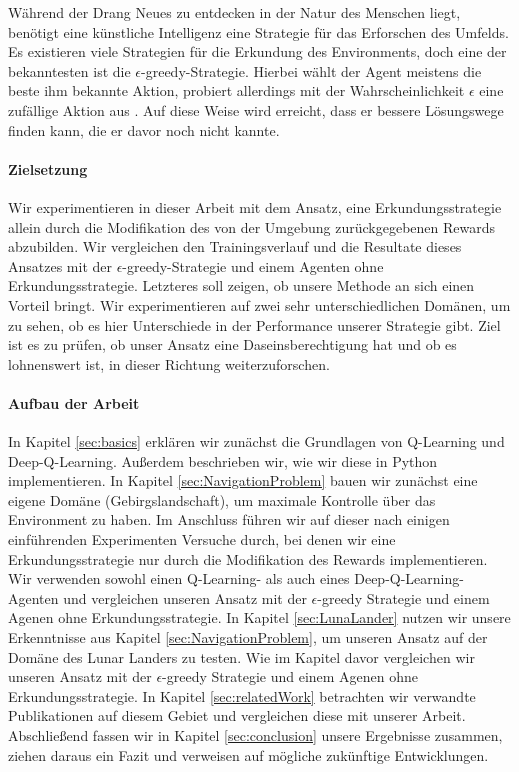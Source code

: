 Während der Drang Neues zu entdecken in der Natur des Menschen liegt, benötigt eine künstliche Intelligenz eine Strategie für das Erforschen des Umfelds.
Es existieren viele Strategien für die Erkundung des Environments, doch eine der bekanntesten ist die $ \epsilon $-greedy-Strategie. Hierbei wählt der Agent meistens die beste ihm bekannte Aktion, probiert allerdings mit der Wahrscheinlichkeit $ \epsilon $ eine zufällige Aktion aus \cite{07_dabney2020temporallyextended, 06_sutton2018reinforcement}. Auf diese Weise wird erreicht, dass er bessere Lösungswege finden kann, die er davor noch nicht kannte.

\paragraph{Zielsetzung}
Wir experimentieren in dieser Arbeit mit dem Ansatz, eine Erkundungsstrategie allein durch die Modifikation des von der Umgebung zurückgegebenen Rewards abzubilden. Wir vergleichen den Trainingsverlauf und die Resultate dieses Ansatzes mit der $ \epsilon $-greedy-Strategie und einem Agenten ohne Erkundungsstrategie. Letzteres soll zeigen, ob unsere Methode an sich einen Vorteil bringt. Wir experimentieren auf zwei sehr unterschiedlichen Domänen, um zu sehen, ob es hier Unterschiede in der Performance unserer Strategie gibt. Ziel ist es zu prüfen, ob unser Ansatz eine Daseinsberechtigung hat und ob es lohnenswert ist, in dieser Richtung weiterzuforschen.

\paragraph{Aufbau der Arbeit}
In Kapitel \ref{sec:basics} erklären wir zunächst die Grundlagen von Q-Learning und Deep-Q-Learning. Außerdem beschrieben wir, wie wir diese in Python implementieren. In Kapitel \ref{sec:NavigationProblem} bauen wir zunächst eine eigene Domäne (Gebirgslandschaft), um maximale Kontrolle über das Environment zu haben. Im Anschluss führen wir auf dieser nach einigen einführenden Experimenten Versuche durch, bei denen wir eine Erkundungsstrategie nur durch die Modifikation des Rewards implementieren. Wir verwenden sowohl einen Q-Learning- als auch eines Deep-Q-Learning-Agenten und vergleichen unseren Ansatz mit der $ \epsilon $-greedy Strategie und einem Agenen ohne Erkundungsstrategie. In Kapitel \ref{sec:LunaLander} nutzen wir unsere Erkenntnisse aus Kapitel \ref{sec:NavigationProblem}, um unseren Ansatz auf der Domäne des Lunar Landers zu testen. Wie im Kapitel davor vergleichen wir unseren Ansatz mit der $ \epsilon $-greedy Strategie und einem Agenen ohne Erkundungsstrategie. In Kapitel \ref{sec:relatedWork} betrachten wir verwandte Publikationen auf diesem Gebiet und vergleichen diese mit unserer Arbeit. Abschließend fassen wir in Kapitel \ref{sec:conclusion} unsere Ergebnisse zusammen, ziehen daraus ein Fazit und verweisen auf mögliche zukünftige Entwicklungen.